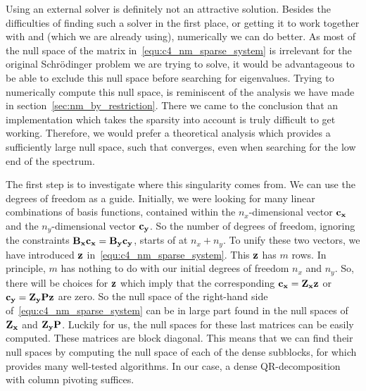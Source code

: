 Using an external solver is definitely not an attractive solution. Besides the difficulties of finding such a solver in the first place, or getting it to work together with \slepc{} and \Eigen{} (which we are already using), numerically we can do better. As most of the null space of the matrix in~\eqref{equ:c4_nm_sparse_system} is irrelevant for the original Schrödinger problem we are trying to solve, it would be advantageous to be able to exclude this null space before searching for eigenvalues. Trying to numerically compute this null space, is reminiscent of the analysis we have made in section~\ref{sec:nm_by_restriction}. There we came to the conclusion that an implementation which takes the sparsity into account is truly difficult to get working. Therefore, we would prefer a theoretical analysis which provides a sufficiently large null space, such that \slepc{} converges, even when searching for the low end of the spectrum.

The first step is to investigate where this singularity comes from. We can use the degrees of freedom as a guide. Initially, we were looking for many linear combinations of basis functions, contained within the $n_x$-dimensional vector $\vb{c_x}$ and the $n_y$-dimensional vector $\vb{c_y}$. So the number of degrees of freedom, ignoring the constraints $\vb{B_x}\vb{c_x} = \vb{B_y}\vb{c_y}$, starts of at $n_x + n_y$. To unify these two vectors, we have introduced $\vb{z}$ in~\eqref{equ:c4_nm_sparse_system}. This $\vb{z}$ has $m$ rows. In principle, $m$ has nothing to do with our initial degrees of freedom $n_x$ and $n_y$. So, there will be choices for $\vb{z}$ which imply that the corresponding $\vb{c_x} = \vb{Z_x} \vb{z}$ or $\vb{c_y} = \vb{Z_y} \vb{P} \vb{z}$ are zero. So the null space of the right-hand side of~\eqref{equ:c4_nm_sparse_system} can be in large part found in the null spaces of $\vb{Z_x}$ and $\vb{Z_y} \vb{P}$. Luckily for us, the null spaces for these last matrices can be easily computed. These matrices are block diagonal. This means that we can find their null spaces by computing the null space of each of the dense subblocks, for which \Eigen{} provides many well-tested algorithms. In our case, a dense QR-decomposition with column pivoting suffices.

